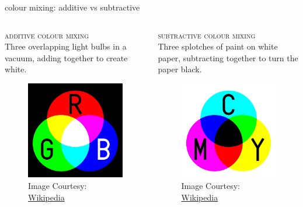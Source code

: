 \documentclass[aspectratio=169,xcolor={dvipsnames,svgnames}]{beamer}
\begin{document}
\begin{frame}[label={sec:org98e45e0}]{colour mixing: additive vs subtractive}
\begin{columns}
\begin{column}{.5\columnwidth}
\textsc{additive colour mixing} \\[0pt]
Three overlapping light bulbs in a vacuum, adding
together to create white.

\begin{figure}[htbp]
\centering
\includegraphics[width=0.6\linewidth]{images/AdditiveColor.svg.png}
\caption{Image Courtesy: \href{https://en.wikipedia.org/wiki/File:AdditiveColor.svg}{Wikipedia}}
\end{figure}
\end{column}
\begin{column}{.5\columnwidth}
\textsc{subtractive colour mixing} \\[0pt]
Three splotches of paint on white paper, subtracting
together to turn the paper black.

\begin{figure}[htbp]
\centering
\includegraphics[width=0.6\linewidth]{images/SubtractiveColor.svg.png}
\caption{Image Courtesy: \href{https://en.wikipedia.org/wiki/File:SubtractiveColor.svg}{Wikipedia}}
\end{figure}
\end{column}
\end{columns}
\end{frame}
\end{document}
